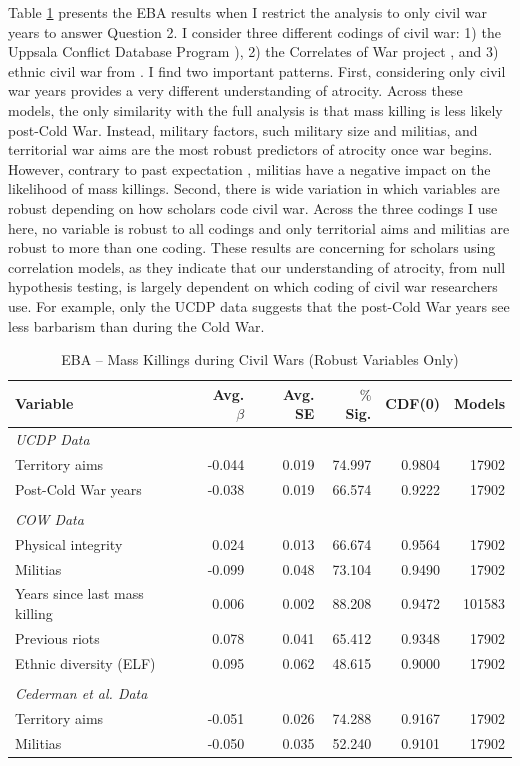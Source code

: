 Table \ref{tab:ucdp} presents the EBA results when I restrict the analysis to only civil war years to answer Question 2. I consider three different codings of civil war: 1) the Uppsala Conflict Database Program \citeyear{allansson2017organized,gleditsch2002armed}), 2) the Correlates of War project \citep{sarkees2010resort}, and 3) ethnic civil war from \citet{cederman2010ethnic}. I find two important patterns. First, considering only civil war years provides a very different understanding of atrocity. Across these models, the only similarity with the full analysis is that mass killing is less likely post-Cold War. Instead, military factors, such military size and militias, and territorial war aims are the most robust predictors of atrocity once war begins. However, contrary to past expectation \citep{koren2017means}, militias have a negative impact on the likelihood of mass killings. Second, there is wide variation in which variables are robust depending on how scholars code civil war. Across the three codings I use here, no variable is robust to all codings and only territorial aims and militias are robust to more than one coding. These results are concerning for scholars using correlation models, as they indicate that our understanding of atrocity, from null hypothesis testing, is largely dependent on which coding of civil war researchers use. For example, only the UCDP data suggests that the post-Cold War years see less barbarism than during the Cold War.

\begin{table}[H]
\centering
\begin{tabular}{lrrrrr}
\hline
\textbf{Variable} & \textbf{Avg. $\beta$} & \textbf{Avg. SE} & \textbf{$\%$ Sig.} & \textbf{CDF(0)} & \textbf{Models} \\ \hline
\textit{UCDP Data} &  &  &  &  &  \\
Territory aims & -0.044 & 0.019 & 74.997 & 0.9804 & 17902 \\
Post-Cold War years & -0.038 & 0.019 & 66.574 & 0.9222 & 17902 \\
 &  &  &  &  &  \\
\textit{COW Data} &  &  &  &  &  \\
Physical integrity & 0.024 & 0.013 & 66.674 & 0.9564 & 17902 \\
Militias & -0.099 & 0.048 & 73.104 & 0.9490 & 17902 \\
Years since last mass killing & 0.006 & 0.002 & 88.208 & 0.9472 & 101583 \\
Previous riots & 0.078 & 0.041 & 65.412 & 0.9348 & 17902 \\
Ethnic diversity (ELF) & 0.095 & 0.062 & 48.615 & 0.9000 & 17902 \\
& & & & \\
\textit{Cederman et al. Data} &  &  &  &  &  \\
Territory aims & -0.051 & 0.026 & 74.288 & 0.9167 & 17902 \\
Militias & -0.050 & 0.035 & 52.240 & 0.9101 & 17902 \\ \hline
\end{tabular}
\caption{EBA -- Mass Killings during Civil Wars (Robust Variables Only)}
\label{tab:ucdp}
\end{table}
	
